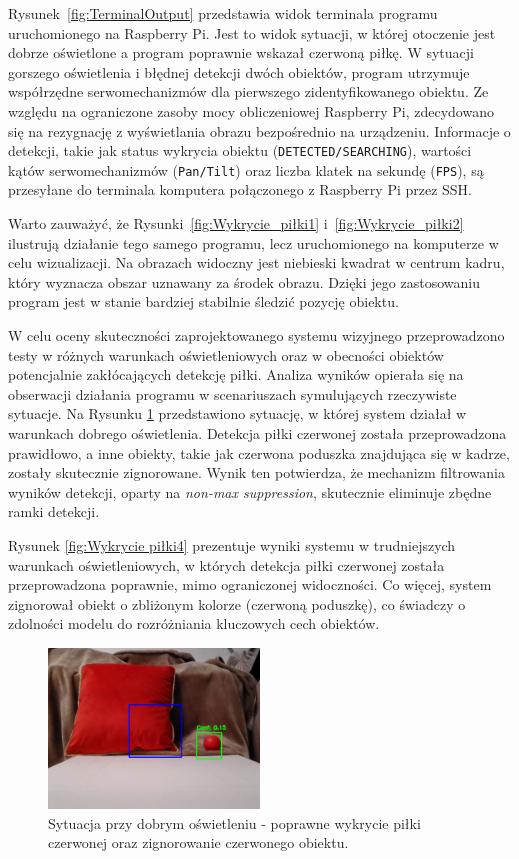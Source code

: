 \documentclass[a4paper,twoside,12pt]{book}
\begin{document}
Rysunek~\ref{fig:TerminalOutput} przedstawia widok terminala programu uruchomionego na Raspberry Pi. Jest to widok sytuacji, w której otoczenie jest dobrze oświetlone a program poprawnie wskazał czerwoną piłkę. W sytuacji gorszego oświetlenia i błędnej detekcji dwóch obiektów, program utrzymuje współrzędne serwomechanizmów dla pierwszego zidentyfikowanego obiektu. Ze względu na ograniczone zasoby mocy obliczeniowej Raspberry Pi, zdecydowano się na rezygnację z wyświetlania obrazu bezpośrednio na urządzeniu. Informacje o detekcji, takie jak status wykrycia obiektu (\texttt{DETECTED/SEARCHING}), wartości kątów serwomechanizmów (\texttt{Pan/Tilt}) oraz liczba klatek na sekundę (\texttt{FPS}), są przesyłane do terminala komputera połączonego z Raspberry Pi przez SSH.

Warto zauważyć, że Rysunki~\ref{fig:Wykrycie_piłki1} i~\ref{fig:Wykrycie_piłki2} ilustrują działanie tego samego programu, lecz uruchomionego na komputerze w celu wizualizacji. Na obrazach widoczny jest niebieski kwadrat w centrum kadru, który wyznacza obszar uznawany za środek obrazu. Dzięki jego zastosowaniu program jest w stanie bardziej stabilnie śledzić pozycję obiektu. 



\newpage
W celu oceny skuteczności zaprojektowanego systemu wizyjnego przeprowadzono testy w różnych warunkach oświetleniowych oraz w obecności obiektów potencjalnie zakłócających detekcję piłki. Analiza wyników opierała się na obserwacji działania programu w scenariuszach symulujących rzeczywiste sytuacje. Na Rysunku \ref{fig:Wykrycie piłki3} przedstawiono sytuację, w której system działał w warunkach dobrego oświetlenia. Detekcja piłki czerwonej została przeprowadzona prawidłowo, a inne obiekty, takie jak czerwona poduszka znajdująca się w kadrze, zostały skutecznie zignorowane. Wynik ten potwierdza, że mechanizm filtrowania wyników detekcji, oparty na \textit{non-max suppression}, skutecznie eliminuje zbędne ramki detekcji.

Rysunek \ref{fig:Wykrycie piłki4} prezentuje wyniki systemu w trudniejszych warunkach oświetleniowych, w których detekcja piłki czerwonej została przeprowadzona poprawnie, mimo ograniczonej widoczności. Co więcej, system zignorował obiekt o zbliżonym kolorze (czerwoną poduszkę), co świadczy o zdolności modelu do rozróżniania kluczowych cech obiektów.

\begin{figure}[!hb]
    \centering
    \includegraphics[width=0.5\textwidth]{Images/Porownanie/Yolo7 robot/Zrzut ekranu 2025-01-02 194354.png}
    \caption{Sytuacja przy dobrym oświetleniu - poprawne wykrycie piłki czerwonej oraz zignorowanie czerwonego obiektu.}
    \label{fig:Wykrycie piłki3}
\end{figure}
\end{document}
